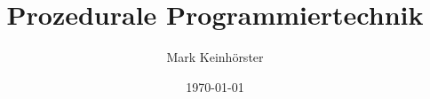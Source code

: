 \title{Prozedurale Programmiertechnik}   
\author{Mark Keinh\"orster}
\date{\today}
\begin{frame}
\titlepage 
\end{frame}